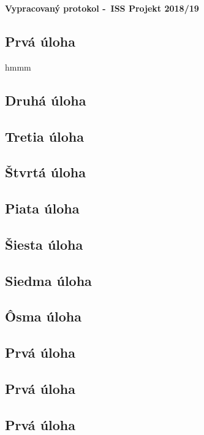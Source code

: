 \documentclass[11pt, a4paper]{article}
\begin{document}
\begin{center}
\LARGE \textbf{Vypracovaný protokol \--\ ISS Projekt 2018/19}
\hfill
\end{center}

\subsection*{Prvá úloha}
hmmm
\subsection*{Druhá úloha}
\subsection*{Tretia úloha}
\subsection*{Štvrtá úloha}
\subsection*{Piata úloha}
\subsection*{Šiesta úloha}
\subsection*{Siedma úloha}
\subsection*{Ôsma úloha}
\subsection*{Prvá úloha}
\subsection*{Prvá úloha}
\subsection*{Prvá úloha}
\end{document}
